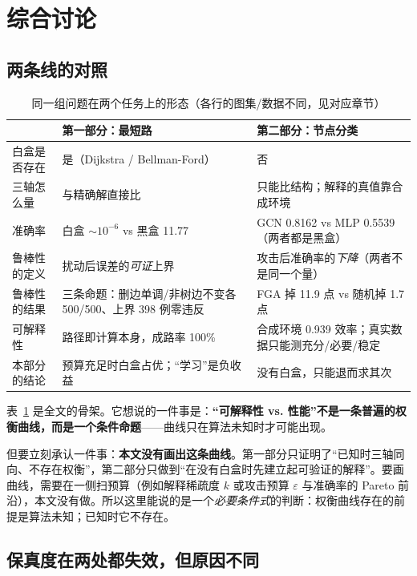 \section{综合讨论}\label{sec:discussion}

\subsection{两条线的对照}

\begin{table}[H]
\centering
\caption{同一组问题在两个任务上的形态（各行的图集/数据不同，见对应章节）}
\label{tab:both}
\small
\setlength{\tabcolsep}{4pt}
\begin{tabular}{p{2.6cm}p{5.2cm}p{5.2cm}}
\toprule
 & 第一部分：最短路 & 第二部分：节点分类 \\
\midrule
白盒是否存在 & 是（Dijkstra / Bellman-Ford） & 否 \\
三轴怎么量 & 与精确解直接比 & 只能比结构；解释的真值靠合成环境 \\
准确率 & 白盒 $\sim10^{-6}$ vs 黑盒 11.77 & GCN 0.8162 vs MLP 0.5539（两者都是黑盒） \\
鲁棒性的定义 & 扰动后误差的\emph{可证}上界 & 攻击后准确率的\emph{下降}（两者不是同一个量） \\
鲁棒性的结果 & 三条命题：删边单调/非树边不变各 500/500、上界 398 例零违反 & FGA 掉 11.9 点 vs 随机掉 1.7 点 \\
可解释性 & 路径即计算本身，成路率 100\% & 合成环境 0.939 效率；真实数据只能测充分/必要/稳定 \\
本部分的结论 & 预算充足时白盒占优；“学习”是负收益 & 没有白盒，只能退而求其次 \\
\bottomrule
\end{tabular}
\end{table}

表~\ref{tab:both} 是全文的骨架。它想说的一件事是：\textbf{“可解释性 vs. 性能”不是一条普遍的权衡曲线，而是一个条件命题}——曲线只在算法未知时才可能出现。

但要立刻承认一件事：\textbf{本文没有画出这条曲线}。第一部分只证明了“已知时三轴同向、不存在权衡”，第二部分只做到“在没有白盒时先建立起可验证的解释”。要画曲线，需要在一侧扫预算（例如解释稀疏度 $k$ 或攻击预算 $\varepsilon$ 与准确率的 Pareto 前沿），本文没有做。所以这里能说的是一个\emph{必要条件式}的判断：权衡曲线存在的前提是算法未知；已知时它不存在。

\subsection{保真度在两处都失效，但原因不同}

